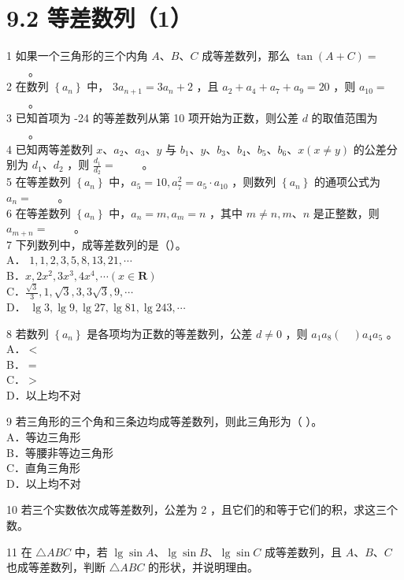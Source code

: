 \documentclass[10pt]{article}
\begin{document}
\section*{9.2 等差数列（1）}
1 如果一个三角形的三个内角 \(A 、 B 、 C\) 成等差数列，那么 \(\tan (A+C)=\) \(\qquad\)。\\
2 在数列 \(\left\{a_{n}\right\}\) 中， \(3 a_{n+1}=3 a_{n}+2\) ，且 \(a_{2}+a_{4}+a_{7}+a_{9}=20\) ，则 \(a_{10}=\) \(\qquad\)。\\
3 已知首项为 -24 的等差数列从第 10 项开始为正数，则公差 \(d\) 的取值范围为 \(\qquad\)。\\
4 已知两等差数列 \(x 、 a_{2} 、 a_{3} 、 y\) 与 \(b_{1} 、 y 、 b_{3} 、 b_{4} 、 b_{5} 、 b_{6} 、 x(x \neq y)\) 的公差分别为 \(d_{1} 、 d_{2}\) ，则 \(\frac{d_{1}}{d_{2}}=\) \(\qquad\)。\\
5 在等差数列 \(\left\{a_{n}\right\}\) 中，\(a_{5}=10, a_{7}^{2}=a_{5} \cdot a_{10}\) ，则数列 \(\left\{a_{n}\right\}\) 的通项公式为 \(a_{n}=\) \(\qquad\)。\\
6 在等差数列 \(\left\{a_{n}\right\}\) 中，\(a_{n}=m, a_{m}=n\) ，其中 \(m \neq n, m 、 n\) 是正整数，则 \(a_{m+n}=\) \(\qquad\)。\\
7 下列数列中，成等差数列的是（）。\\
A． \(1,1,2,3,5,8,13,21, \cdots\)\\
B．\(x, 2 x^{2}, 3 x^{3}, 4 x^{4}, \cdots(x \in \mathbf{R})\)\\
C．\(\frac{\sqrt{3}}{3}, 1, \sqrt{3}, 3,3 \sqrt{3}, 9, \cdots\)\\
D． \(\lg 3, \lg 9, \lg 27, \lg 81, \lg 243, \cdots\)

8 若数列 \(\left\{a_{n}\right\}\) 是各项均为正数的等差数列，公差 \(d \neq 0\) ，则 \(a_{1} a_{8}(\quad) a_{4} a_{5}\) 。\\
A．\(<\)\\
B．\(=\)\\
C．\(>\)\\
D．以上均不对

9 若三角形的三个角和三条边均成等差数列，则此三角形为（ ）。\\
A．等边三角形\\
B．等腰非等边三角形\\
C．直角三角形\\
D．以上均不对

10 若三个实数依次成等差数列，公差为 2 ，且它们的和等于它们的积，求这三个数。

11 在 \(\triangle A B C\) 中，若 \(\lg \sin A 、 \lg \sin B 、 \lg \sin C\) 成等差数列，且 \(A 、 B 、 C\) 也成等差数列，判断 \(\triangle A B C\) 的形状，并说明理由。
\end{document}
